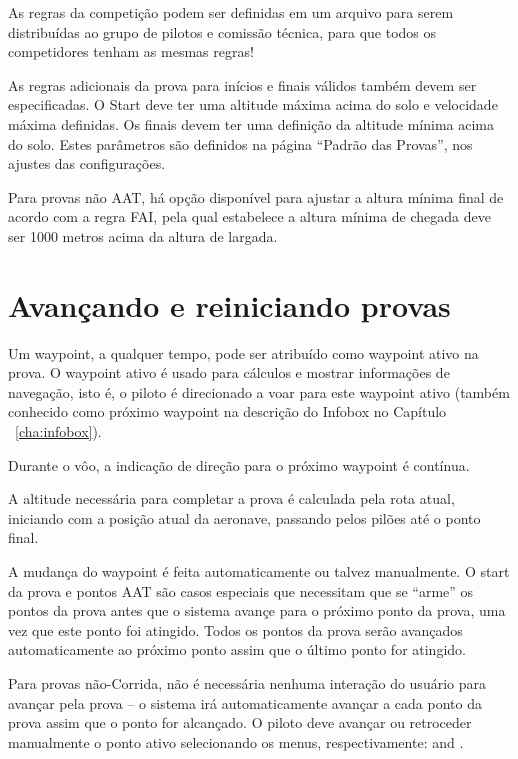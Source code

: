 \tip As regras da competição podem ser definidas em um arquivo para serem distribuídas ao grupo de pilotos e comissão técnica, para que todos os competidores tenham as mesmas regras!

As regras adicionais da prova para inícios e finais válidos também devem ser especificadas.  O Start deve ter uma altitude máxima acima do solo e velocidade máxima definidas.  Os finais devem ter uma definição da altitude mínima acima do solo.  Estes parâmetros são definidos na página “Padrão das Provas”, nos ajustes das configurações.

Para provas não AAT, há opção disponível para ajustar a altura mínima final de acordo com a regra FAI, pela qual estabelece a altura mínima de chegada deve ser 1000 metros acima da altura de largada.




\section{Avançando e reiniciando provas}\label{sec:advanc-rest-tasks}
Um waypoint, a qualquer tempo, pode ser atribuído como waypoint ativo na prova.  O waypoint ativo é usado para cálculos e mostrar informações de navegação, isto é, o piloto é direcionado a voar para este waypoint ativo (também conhecido como próximo waypoint na descrição do Infobox no Capítulo ~\ref{cha:infobox}).

Durante o vôo, a indicação de direção para o próximo waypoint é contínua.

A altitude necessária para completar a prova é calculada pela rota atual, iniciando com a posição atual da aeronave, passando pelos pilões até o ponto final.

A mudança do waypoint é feita automaticamente ou talvez manualmente.  O start da prova e pontos AAT são casos especiais que necessitam que se “arme” os pontos da prova antes que o sistema avançe para o próximo ponto da prova, uma vez que este ponto foi atingido.  Todos os pontos da prova serão avançados automaticamente ao próximo ponto assim que o último ponto for atingido.

Para provas não-Corrida, não é necessária nenhuma interação do usuário para avançar pela prova – o sistema irá automaticamente avançar a cada ponto da prova assim que o ponto for alcançado.  O piloto deve avançar ou retroceder manualmente o ponto ativo selecionando os menus, respectivamente:
 \blink{} and
\blink{}.

